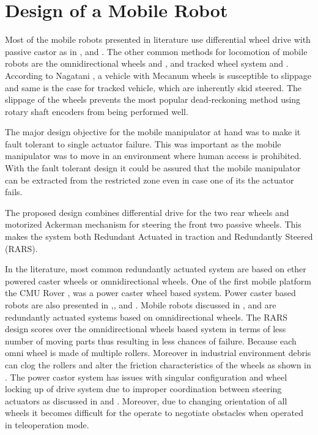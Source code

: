 \chapter{Design of a Mobile Robot}
\label{ch_3:Design}

Most of the mobile robots presented in literature use differential wheel drive  with passive castor as in \cite{saha1989kinematics}, \cite{yamamoto1992coordinating} and \cite{rajendran2004}. The other  common methods for locomotion of mobile robots are the omnidirectional wheels  \cite{pin1994new} and \cite{salih2006designing}, and tracked wheel system \cite{suthakorn2009design} and \cite{guarnieri2004development}. According  to  Nagatani \cite{nagatani2000improvement},  a  vehicle  with  Mecanum  wheels  is  susceptible  to slippage and same is the case for tracked vehicle, which are inherently skid steered. The slippage of the wheels prevents the most popular dead-reckoning method using rotary shaft  encoders   from  being  performed  well.

The major design objective for the  mobile manipulator at hand  was to make it fault tolerant to single actuator failure. This was important as  the mobile manipulator was to move in an environment where human access is prohibited. With the fault tolerant design it could be assured that the mobile manipulator can be extracted from the restricted zone even in case  one of its the actuator fails. 

 The proposed design combines differential drive for the two rear wheels and  motorized Ackerman mechanism for steering the front two passive wheels. This makes the system both Redundant Actuated in traction and Redundantly Steered (RARS).  
 
 In the literature, most common redundantly  actuated system are based on ether powered caster wheels or omnidirectional wheels. One of the first mobile platform the CMU Rover \cite{moravec1982cmu, moravec1983stanford},  was a power caster wheel based system.  Power caster based robots are also presented in \cite{oetomo2008singularity},\cite{chung2010design},\cite{li2006wheel} and \cite{park2002optimal}.   Mobile robots discussed in \cite{muir1987kinematic},\cite{yi2002kinematics} and  \cite{saha1995design} are redundantly actuated systems based on omnidirectional wheels.  The RARS design scores over the omnidirectional wheels based system in terms of less number  of moving parts thus resulting in less chances of failure. Because each omni wheel is made of multiple rollers. Moreover in industrial environment debris can clog the rollers and alter the friction characteristics of the wheels as shown in \cite{carlson2005ugvs}. 
   The power castor system has issues with singular configuration and wheel locking up of drive system due to improper coordination between steering actuators as discussed in \cite{oetomo2008singularity} and \cite{low2005kinematic}. Moreover, due to changing orientation of all wheels it becomes difficult for the operate to negotiate obstacles when operated in teleoperation mode.


